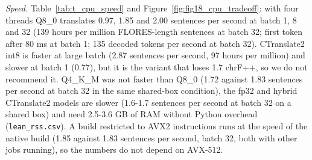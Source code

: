 \emph{Speed.} Table~\ref{tab:t_cpu_speed} and Figure~\ref{fig:fig18_cpu_tradeoff}: with four threads Q8\_0 translates 0.97, 1.85 and 2.00 sentences per second at batch 1, 8 and 32 (139 hours per million FLORES-length sentences at batch 32; first token after 80 ms at batch 1; 135 decoded tokens per second at batch 32). CTranslate2 int8 is faster at large batch (2.87 sentences per second, 97 hours per million) and slower at batch 1 (0.77), but it is the variant that loses 1.7 chrF++, so we do not recommend it. Q4\_K\_M was not faster than Q8\_0 (1.72 against 1.83 sentences per second at batch 32 in the same shared-box condition), the fp32 and hybrid CTranslate2 models are slower (1.6-1.7 sentences per second at batch 32 on a shared box) and need 2.5-3.6 GB of RAM without Python overhead (\texttt{lean\_rss.csv}). A build restricted to AVX2 instructions runs at the speed of the native build (1.85 against 1.83 sentences per second, batch 32, both with other jobs running), so the numbers do not depend on AVX-512.

